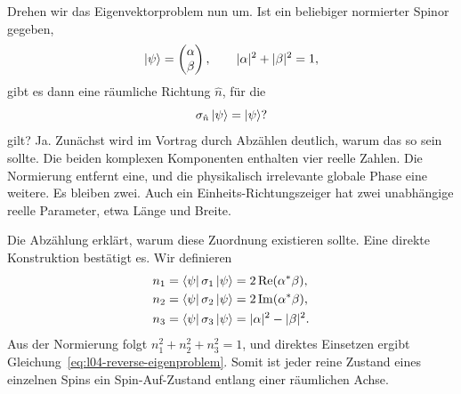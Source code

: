 Drehen wir das Eigenvektorproblem nun um. Ist ein beliebiger normierter Spinor gegeben,
\begin{equation}
  \left\lvert\psi\right\rangle=
  \begin{pmatrix}\alpha\\\beta\end{pmatrix},
  \qquad
  |\alpha|^2+|\beta|^2=1,
  \label{eq:l04-general-spinor}
\end{equation}
gibt es dann eine räumliche Richtung \(\hat n\), für die
\begin{equation}
  \sigma_{\hat n}\left\lvert\psi\right\rangle=\left\lvert\psi\right\rangle?
  \label{eq:l04-reverse-eigenproblem}
\end{equation}
gilt? Ja. Zunächst wird im Vortrag durch Abzählen deutlich, warum das so sein sollte. Die beiden komplexen Komponenten enthalten vier reelle Zahlen. Die Normierung entfernt eine, und die physikalisch irrelevante globale Phase eine weitere. Es bleiben zwei. Auch ein Einheits-Richtungszeiger hat zwei unabhängige reelle Parameter, etwa Länge und Breite.

\begin{classroomqa}
\end{classroomqa}

\begin{classroomqa}
\end{classroomqa}

Die Abzählung erklärt, warum diese Zuordnung existieren sollte. Eine direkte Konstruktion bestätigt es. Wir definieren
\begin{align}
  n_1&=\left\langle\psi\right\rvert\sigma_1\left\lvert\psi\right\rangle
      =2\operatorname{Re}(\alpha^*\beta),
  \notag\\
  n_2&=\left\langle\psi\right\rvert\sigma_2\left\lvert\psi\right\rangle
      =2\operatorname{Im}(\alpha^*\beta),
  \notag\\
  n_3&=\left\langle\psi\right\rvert\sigma_3\left\lvert\psi\right\rangle
      =|\alpha|^2-|\beta|^2.
  \label{eq:l04-bloch-components}
\end{align}
Aus der Normierung folgt \(n_1^2+n_2^2+n_3^2=1\), und direktes Einsetzen ergibt Gleichung~\eqref{eq:l04-reverse-eigenproblem}. Somit ist jeder reine Zustand eines einzelnen Spins ein Spin-Auf-Zustand entlang einer räumlichen Achse.

